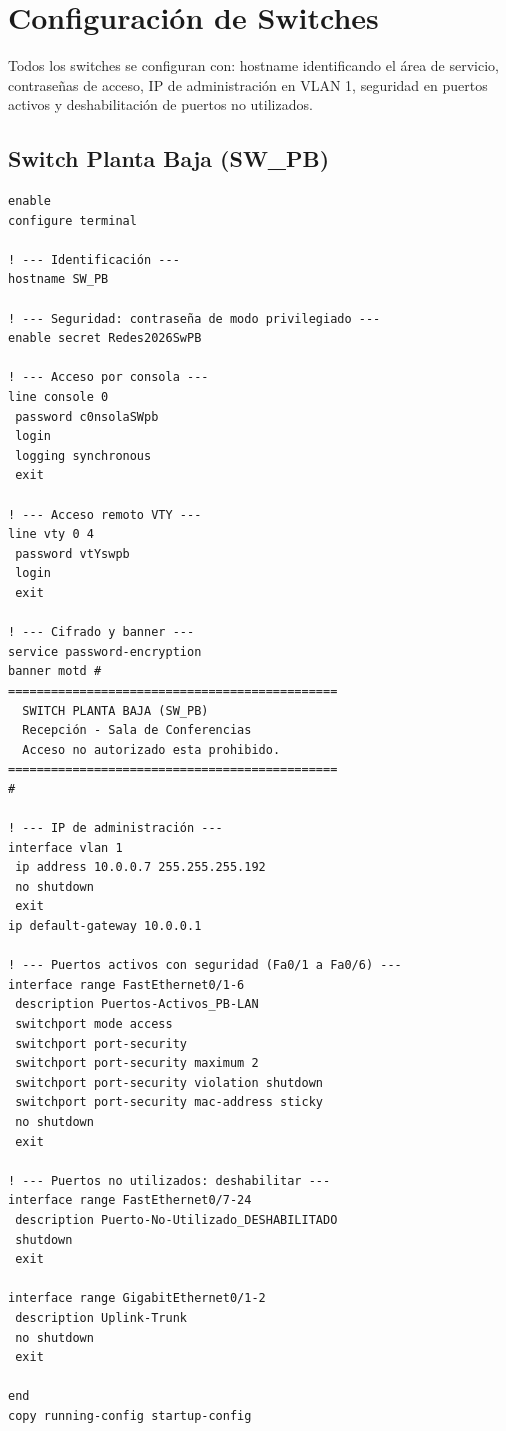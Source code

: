 \documentclass[letterpaper,11pt]{article}
\begin{document}
\section{Configuración de Switches}

Todos los switches se configuran con: hostname identificando el área de servicio, contraseñas de acceso, IP de administración en VLAN 1, seguridad en puertos activos y deshabilitación de puertos no utilizados.

\subsection{Switch Planta Baja (SW\_PB)}

\begin{lstlisting}[style=cisco, caption={Configuración completa de SW\_PB}]
enable
configure terminal

! --- Identificación ---
hostname SW_PB

! --- Seguridad: contraseña de modo privilegiado ---
enable secret Redes2026SwPB

! --- Acceso por consola ---
line console 0
 password c0nsolaSWpb
 login
 logging synchronous
 exit

! --- Acceso remoto VTY ---
line vty 0 4
 password vtYswpb
 login
 exit

! --- Cifrado y banner ---
service password-encryption
banner motd #
==============================================
  SWITCH PLANTA BAJA (SW_PB)
  Recepción - Sala de Conferencias
  Acceso no autorizado esta prohibido.
==============================================
#

! --- IP de administración ---
interface vlan 1
 ip address 10.0.0.7 255.255.255.192
 no shutdown
 exit
ip default-gateway 10.0.0.1

! --- Puertos activos con seguridad (Fa0/1 a Fa0/6) ---
interface range FastEthernet0/1-6
 description Puertos-Activos_PB-LAN
 switchport mode access
 switchport port-security
 switchport port-security maximum 2
 switchport port-security violation shutdown
 switchport port-security mac-address sticky
 no shutdown
 exit

! --- Puertos no utilizados: deshabilitar ---
interface range FastEthernet0/7-24
 description Puerto-No-Utilizado_DESHABILITADO
 shutdown
 exit

interface range GigabitEthernet0/1-2
 description Uplink-Trunk
 no shutdown
 exit

end
copy running-config startup-config
\end{lstlisting}
\end{document}
